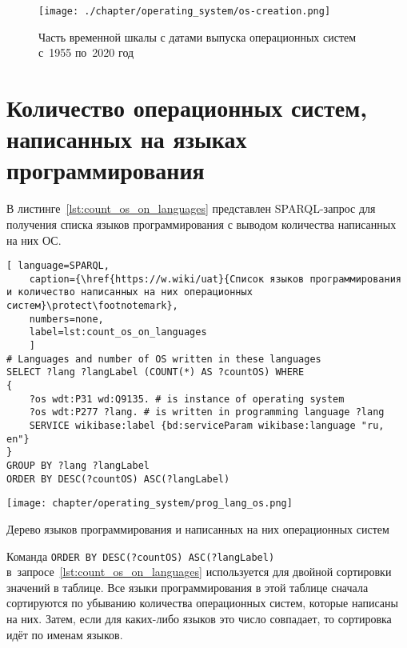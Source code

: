 \begin{figure*}[h!]
	\texttt{[image: ./chapter/operating\_system/os-creation.png]}
    \caption[Часть временной шкалы с датами выпуска ОС.]{Часть временной шкалы с датами выпуска операционных систем с~1955 по~2020 год}%
	\label{fig:os_creation}
\end{figure*}





\section{Количество операционных систем, написанных на языках программирования}

В листинге~\ref{lst:count_os_on_languages} представлен SPARQL-запрос для получения списка языков программирования с выводом количества написанных на них ОС.

\begin{lstlisting}[ language=SPARQL, 
	caption={\href{https://w.wiki/uat}{Список языков программирования и количество написанных на них операционных систем}\protect\footnotemark},
    numbers=none,
	label=lst:count_os_on_languages
	]
# Languages and number of OS written in these languages
SELECT ?lang ?langLabel (COUNT(*) AS ?countOS) WHERE 
{
	?os wdt:P31 wd:Q9135. # is instance of operating system
	?os wdt:P277 ?lang. # is written in programming language ?lang
    SERVICE wikibase:label {bd:serviceParam wikibase:language "ru, en"}
}
GROUP BY ?lang ?langLabel
ORDER BY DESC(?countOS) ASC(?langLabel)
\end{lstlisting}



\newpage\phantom{blabla}
\newpage
%
\begin{marginfigure}[0\baselineskip]
    \texttt{[image: chapter/operating\_system/prog\_lang\_os.png]}
    \caption[Дерево языков программирования и написанных на них ОС.]{Дерево языков программирования и написанных на них операционных систем}
	\label{fig:prog_lang_os}%
\end{marginfigure}
%
Команда \lstinline|ORDER BY DESC(?countOS) ASC(?langLabel)| в~запросе~\ref{lst:count_os_on_languages} 
используется для двойной сортировки значений в таблице. 
Все языки программирования в этой таблице сначала сортируются по убыванию количества операционных систем, 
которые написаны на них. Затем, если для каких-либо языков это число совпадает, 
то сортировка идёт по именам языков.

